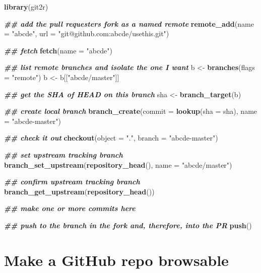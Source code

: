 \documentclass[
]{book}
\newenvironment{Shaded}{\begin{snugshade}}{\end{snugshade}}
\newcommand{\AttributeTok}[1]{\textcolor[rgb]{0.13,0.29,0.53}{#1}}
\newcommand{\DocumentationTok}[1]{\textcolor[rgb]{0.56,0.35,0.01}{\textbf{\textit{#1}}}}
\newcommand{\FunctionTok}[1]{\textcolor[rgb]{0.13,0.29,0.53}{\textbf{#1}}}
\newcommand{\NormalTok}[1]{#1}
\newcommand{\OtherTok}[1]{\textcolor[rgb]{0.56,0.35,0.01}{#1}}
\newcommand{\StringTok}[1]{\textcolor[rgb]{0.31,0.60,0.02}{#1}}
\begin{document}
\begin{Shaded}
\begin{Highlighting}[]
\FunctionTok{library}\NormalTok{(git2r)}

\DocumentationTok{\#\# add the pull requester\textquotesingle{}s fork as a named remote}
\FunctionTok{remote\_add}\NormalTok{(}\AttributeTok{name =} \StringTok{"abcde"}\NormalTok{, }\AttributeTok{url =} \StringTok{"git@github.com:abcde/usethis.git"}\NormalTok{)}

\DocumentationTok{\#\# fetch}
\FunctionTok{fetch}\NormalTok{(}\AttributeTok{name =} \StringTok{"abcde"}\NormalTok{)}

\DocumentationTok{\#\# list remote branches and isolate the one I want}
\NormalTok{b }\OtherTok{\textless{}{-}} \FunctionTok{branches}\NormalTok{(}\AttributeTok{flags =} \StringTok{"remote"}\NormalTok{)}
\NormalTok{b }\OtherTok{\textless{}{-}}\NormalTok{ b[[}\StringTok{"abcde/master"}\NormalTok{]]}

\DocumentationTok{\#\# get the SHA of HEAD on this branch}
\NormalTok{sha }\OtherTok{\textless{}{-}} \FunctionTok{branch\_target}\NormalTok{(b)}

\DocumentationTok{\#\# create local branch}
\FunctionTok{branch\_create}\NormalTok{(}\AttributeTok{commit =} \FunctionTok{lookup}\NormalTok{(}\AttributeTok{sha =}\NormalTok{ sha), }\AttributeTok{name =} \StringTok{"abcde{-}master"}\NormalTok{)}

\DocumentationTok{\#\# check it out}
\FunctionTok{checkout}\NormalTok{(}\AttributeTok{object =} \StringTok{"."}\NormalTok{, }\AttributeTok{branch =} \StringTok{"abcde{-}master"}\NormalTok{)}

\DocumentationTok{\#\# set upstream tracking branch}
\FunctionTok{branch\_set\_upstream}\NormalTok{(}\FunctionTok{repository\_head}\NormalTok{(), }\AttributeTok{name =} \StringTok{"abcde/master"}\NormalTok{)}

\DocumentationTok{\#\# confirm upstream tracking branch}
\FunctionTok{branch\_get\_upstream}\NormalTok{(}\FunctionTok{repository\_head}\NormalTok{())}

\DocumentationTok{\#\# make one or more commits here}

\DocumentationTok{\#\# push to the branch in the fork and, therefore, into the PR}
\FunctionTok{push}\NormalTok{()}
\end{Highlighting}
\end{Shaded}

\chapter{Make a GitHub repo browsable}\label{workflows-browsability}
\end{document}
